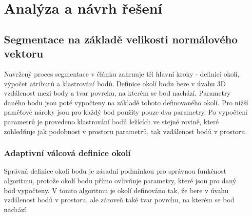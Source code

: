 \documentclass[11pt,twoside,a4paper]{book}
\begin{document}

\chapter{Analýza a návrh řešení}
\label{chap:analyza}

\section{Segmentace na základě velikosti normálového vektoru}

Navržený proces segmentace v článku \cite{Seg01} zahrnuje tři hlavní kroky - definici okolí, výpočet atributů a klastrování bodů. Definice okolí bodu bere v úvahu 3D vzdálenost mezi body a tvar povrchu, na kterém se bod nachází. Parametry daného bodu jsou poté vypočteny na základě tohoto definovaného okolí. Pro nižší paměťové nároky jsou pro každý bod použity pouze dva parametry. Po vypočtení parametrů je provedeno klastrování bodů ležících ve stejné rovině, které zohledňuje jak podobnost v prostoru parametrů, tak vzdálenost bodů v prostoru.

\subsection{Adaptivní válcová definice okolí} 
\label{sub:def-okoli}

Správná definice okolí bodu je zásadní podmínkou pro správnou funkčnost algoritmu, protože okolí bodu přímo ovlivňuje parametry, které jsou pro daný bod vypočteny. V tomto algoritmu je okolí definováno tak, že bere v úvahu vzdálenost bodů v prostoru, ale zároveň také tvar povrchu, na kterém se bod nachází.
\end{document}
